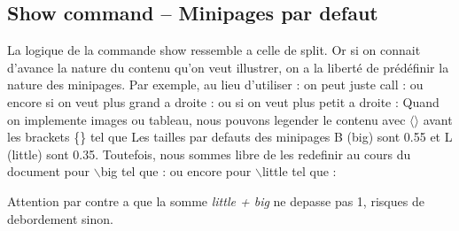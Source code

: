 \documentclass[12pt,a4paper]{article}
\begin{document}



\newpage






\subsection{Show command -- Minipages par defaut}

La logique de la commande show ressemble a celle de split. Or si on connait d'avance la nature du contenu qu'on veut illustrer, on a la liberté de prédéfinir la nature des minipages. Par exemple, au lieu d'utiliser : 
    on peut juste call : 
    ou encore si on veut plus grand a droite : 
    ou si on veut plus petit a droite : 
    \newline
    Quand on implemente images ou tableau, nous pouvons legender le contenu avec $\langle \rangle$ avant les brackets \{\} tel que 
    Les tailles par defauts des minipages B (big) sont 0.55 et L (little) sont 0.35. Toutefois, nous sommes libre de les redefinir au cours du document pour $\backslash$big tel que :
    ou encore pour $\backslash$little tel que : 

    Attention par contre a que la somme \textit{little + big} ne depasse pas 1, risques de debordement sinon. 
\end{document}
